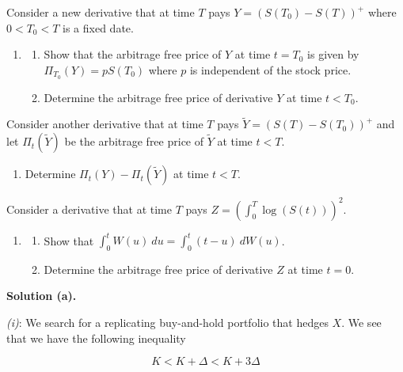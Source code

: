 \documentclass[
]{book}
\providecommand{\tightlist}{%
  \setlength{\itemsep}{0pt}\setlength{\parskip}{0pt}}
\begin{document}
Consider a new derivative that at time \(T\) pays \(Y=\left(S(T_0)-S(T)\right)^+\) where \(0<T_0<T\) is a fixed date.

\begin{enumerate}
\def\labelenumi{\alph{enumi}.}
\setcounter{enumi}{1}
\item
  \begin{enumerate}
  \def\labelenumii{\roman{enumii}.}
  \tightlist
  \item
    Show that the arbitrage free price of \(Y\) at time \(t=T_0\) is given by \(\Pi_{T_0}(Y)=pS(T_0)\) where \(p\) is independent of the stock price.
  \item
    Determine the arbitrage free price of derivative \(Y\) at time \(t<T_0\).
  \end{enumerate}
\end{enumerate}

Consider another derivative that at time \(T\) pays \(\tilde{Y}=\left(S(T)-S(T_0)\right)^+\) and let \(\Pi_t(\tilde{Y})\) be the arbitrage free price of \(\tilde{Y}\) at time \(t<T\).

\begin{enumerate}
\def\labelenumi{\alph{enumi}.}
\setcounter{enumi}{2}
\tightlist
\item
  Determine \(\Pi_t(Y)-\Pi_t(\tilde{Y})\) at time \(t<T\).
\end{enumerate}

Consider a derivative that at time \(T\) pays \(Z=\left(\int_0^T \log(S(t))\right)^2\).

\begin{enumerate}
\def\labelenumi{\alph{enumi}.}
\setcounter{enumi}{3}
\item
  \begin{enumerate}
  \def\labelenumii{\roman{enumii}.}
  \tightlist
  \item
    Show that \(\int_0^t W(u)\ du=\int_0^t(t-u)\ dW(u)\).
  \item
    Determine the arbitrage free price of derivative \(Z\) at time \(t=0\).
  \end{enumerate}
\end{enumerate}

\noindent\makebox[\linewidth]{\rule{\textwidth}{0.4pt}}

\textbf{Solution (a).}

\emph{(i)}: We search for a replicating buy-and-hold portfolio that hedges \(X\). We see that we have the following inequality

\[
K<K+\Delta<K+3\Delta
\]
\end{document}
